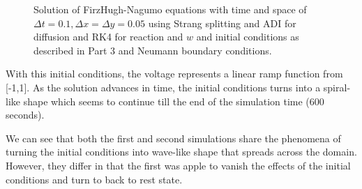 \begin{figure}[tbh]
 
   
  \caption{Solution of FirzHugh-Nagumo equations with time and space of $\Delta t=0.1, \Delta x = \Delta y=0.05$ using Strang splitting and ADI for diffusion and RK4 for reaction and $w$ and initial conditions as described in Part 3 and Neumann boundary conditions.}
   \label{fig:sol3}
\end{figure} 

With this initial conditions, the voltage represents a linear ramp function from [-1,1]. As the solution advances in time, the initial conditions turns into a spiral-like shape which seems to continue till the end of the simulation time (600 seconds). 

We can see that both the first and second simulations share the phenomena of turning the initial conditions into wave-like shape that spreads across the domain. However, they differ in that the first was apple to vanish the effects of the initial conditions and turn to back to rest state. 


